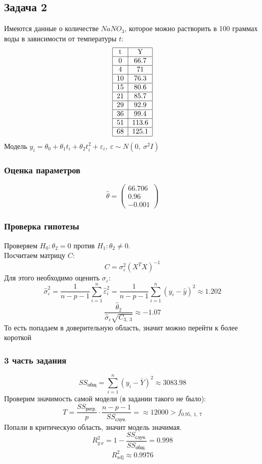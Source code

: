 \documentclass[12pt, a4paper]{article}
\begin{document}
\subsection*{Задача 2}
Имеются данные о количестве $NaNO_3$, которое можно растворить в 100 граммах воды в зависимости от температуры $t$:
\[
\begin{tabular}{|c|c|}
    \hline
    t & Y\\
    \hline
    0 & 66.7\\
    \hline
    4 & 71\\
    \hline
    10& 76.3\\
    \hline
    15& 80.6\\
    \hline
    21& 85.7\\
    \hline
    29& 92.9\\
    \hline
    36& 99.4\\
    \hline
    51& 113.6\\
    \hline
    68& 125.1\\
    \hline
\end{tabular}
\]
Модель $y_i = \theta_0 + \theta_1 t_i + \theta_2 t_i^2 + \varepsilon_i,\ \varepsilon\sim N(0,\ \sigma^2 I)$
\subsubsection*{Оценка параметров}
\[
\hat \theta = \begin{pmatrix}
    66.706\\
    0.96\\
    -0.001
\end{pmatrix}
\]
\subsubsection*{Проверка гипотезы}
Проверяем $H_0: \theta_2 = 0$ против $H_1: \theta_2 \neq 0$.\\
Посчитаем матрицу $C$:
\[
C = \sigma^2_{\varepsilon} \left( X^T X \right)^{-1}
\]
Для этого необходимо оценить $\sigma_{\varepsilon}$:
\[
\hat \sigma^2_{\varepsilon} = \frac{1}{n - p - 1} \sum_{i = 1}^{n} \hat \varepsilon^2_i = \frac{1}{n - p - 1} \sum_{i = 1}^{n} {\left( y_i - \hat y \right)}^2 \approx 1.202
\]
\[
\frac{\hat \theta_2}{\hat\sigma_{\varepsilon}\sqrt{C_{3,\ 3}}} \approx -1.07
\]
То есть попадаем в доверительную область, значит можно перейти к более короткой 
\subsubsection*{3 часть задания}
\[
SS_{\text{общ}} = \sum_{i = 1}^{n} {\left( y_i - \overline{Y} \right)}^2 \approx 3083.98
\]
Проверим значимость самой модели (в задании такого не было):
\[
T = \frac{SS_{\text{регр.}}}{p} \cdot \frac{n -p - 1}{SS_{\text{случ.}}} = \approx 12000 > f_{0.95,\ 1,\ 7} 
\]
Попали в критическую область, значит модель значимая.
\[
R_{y\, x}^2 = 1 - \frac{SS_{\text{случ.}}}{SS_{\text{общ.}}} = 0.998
\]
\[
R^2_{\text{adj}} \approx 0.9976
\]
\end{document}
